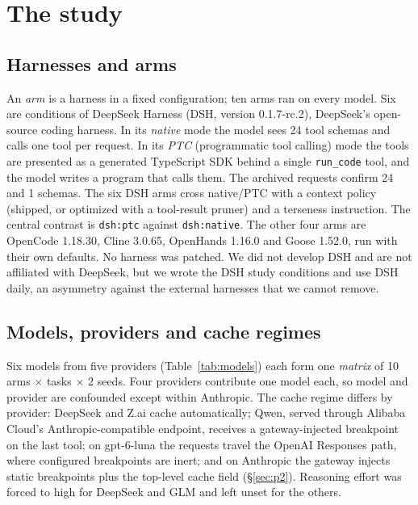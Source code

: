 \documentclass[10pt]{article}
\begin{document}
\section{The study}\label{sec:study}

\subsection{Harnesses and arms}

An \emph{arm} is a harness in a fixed configuration; ten arms ran on every model. Six are conditions
of DeepSeek Harness (DSH, version 0.1.7-rc.2), DeepSeek's open-source coding harness. In its
\emph{native} mode the model sees 24 tool schemas and calls one tool per request. In its \emph{PTC}
(programmatic tool calling) mode the tools are presented as a generated TypeScript SDK behind a single
\texttt{run\_code} tool, and the model writes a program that calls them. The archived requests
confirm 24 and 1 schemas. The six DSH arms cross native/PTC with a context policy (shipped, or
optimized with a tool-result pruner) and a terseness instruction. The central contrast is
\texttt{dsh:ptc} against \texttt{dsh:native}. The other four arms are OpenCode 1.18.30, Cline 3.0.65,
OpenHands 1.16.0 and Goose 1.52.0, run with their own defaults. No harness was patched. We did not
develop DSH and are not affiliated with DeepSeek, but we wrote the DSH study conditions and use DSH
daily, an asymmetry against the external harnesses that we cannot remove.

\subsection{Models, providers and cache regimes}

Six models from five providers (Table~\ref{tab:models}) each form one \emph{matrix} of
10 arms $\times$ tasks $\times$ 2 seeds. Four providers contribute one model each, so model and provider
are confounded except within Anthropic. The cache regime differs by provider: DeepSeek and Z.ai cache
automatically; Qwen, served through Alibaba Cloud's Anthropic-compatible endpoint, receives a
gateway-injected breakpoint on the last tool; on gpt-6-luna the requests travel the OpenAI Responses
path, where configured breakpoints are inert; and on Anthropic the gateway injects static breakpoints
plus the top-level cache field (\S\ref{sec:p2}). Reasoning effort was forced to high for DeepSeek and
GLM and left unset for the others.
\end{document}
